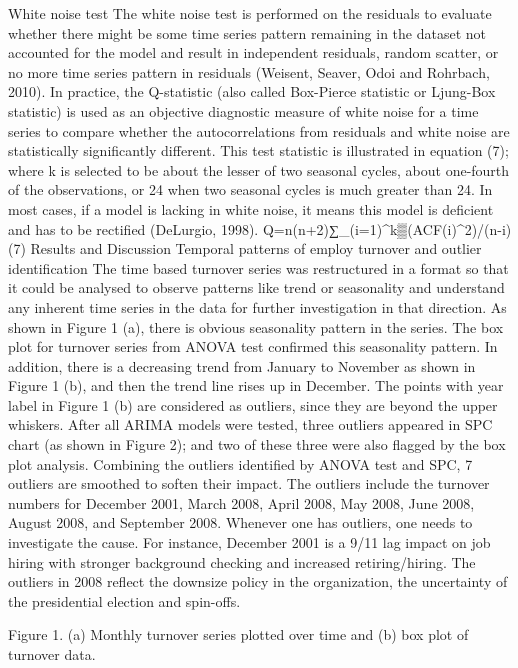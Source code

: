 White noise test
The white noise test is performed on the residuals to evaluate whether there might be some time series pattern remaining in the dataset not accounted for the model and result in independent residuals, random scatter, or no more time series pattern in residuals (Weisent, Seaver, Odoi and Rohrbach, 2010). In practice, the Q-statistic (also called Box-Pierce statistic or Ljung-Box statistic) is used as an objective diagnostic measure of white noise for a time series to compare whether the autocorrelations from residuals and white noise are statistically significantly different. This test statistic is illustrated in equation (7); where k is selected to be about the lesser of two seasonal cycles, about one-fourth of the observations, or 24 when two seasonal cycles is much greater than 24. In most cases, if a model is lacking in white noise, it means this model is deficient and has to be rectified  (DeLurgio, 1998). 
Q=n(n+2)∑_(i=1)^k▒(ACF(i)^2)/(n-i)            (7)
Results and Discussion
Temporal patterns of employ turnover and outlier identification
The time based turnover series was restructured in a format so that it could be analysed to observe patterns like trend or seasonality and understand any inherent time series in the data for further investigation in that direction. As shown in Figure 1 (a), there is obvious seasonality pattern in the series. The box plot for turnover series from ANOVA test confirmed this seasonality pattern. In addition, there is a decreasing trend from January to November as shown in Figure 1 (b), and then the trend line rises up in December. The points with year label in Figure 1 (b) are considered as outliers, since they are beyond the upper whiskers. After all ARIMA models were tested, three outliers appeared in SPC chart (as shown in Figure 2); and two of these three were also flagged by the box plot analysis. Combining the outliers identified by ANOVA test and SPC, 7 outliers are smoothed to soften their impact. The outliers include the turnover numbers for December 2001, March 2008, April 2008, May 2008, June 2008, August 2008, and September 2008. Whenever one has outliers, one needs to investigate the cause. For instance, December 2001 is a 9/11 lag impact on job hiring with stronger background checking and increased retiring/hiring. The outliers in 2008 reflect the downsize policy in the organization, the uncertainty of the presidential election and spin-offs. 

Figure 1. (a) Monthly turnover series plotted over time and (b) box plot of turnover data.

